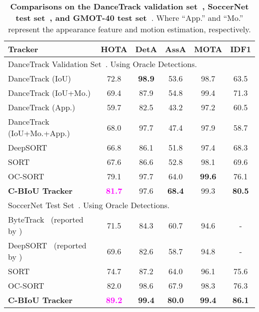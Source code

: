\documentclass[journal]{IEEEtran}
\begin{document}
\begin{table}[t]
\caption{\textbf{Comparisons on the DanceTrack validation set~\cite{sun2022dancetrack}, SoccerNet test set~\cite{cioppa2022soccernet,deliege2021soccernet}, and GMOT-40 test set~\cite{bai2021gmot}}. Where ``App.''  and ``Mo.'' represent the appearance feature and motion estimation, respectively. }
   
\centering
   \setlength{\tabcolsep}{0.5pt}
   \footnotesize
   \begin{tabular}{ l ccccc}
   \toprule
   Tracker & HOTA & DetA & AssA & MOTA & IDF1\\
   \midrule
   \hline
   \multicolumn{6}{l}{DanceTrack Validation Set~\cite{sun2022dancetrack}. Using Oracle Detections. }   \\
DanceTrack (IoU) \cite{sun2022dancetrack} & 72.8 & \textbf{98.9} & 53.6 & 98.7 & 63.5\\  
   DanceTrack (IoU+Mo.) \cite{sun2022dancetrack}  & 69.4 & 87.9 & 54.8 & 99.4 & 71.3\\ 
   DanceTrack (App.) \cite{sun2022dancetrack} &  59.7 & 82.5 & 43.2 & 97.2 & 60.5\\ 
   DanceTrack (IoU+Mo.+App.) \cite{sun2022dancetrack} &   68.0 & 97.7 & 47.4 & 97.9 & 58.7\\ 
   DeepSORT~\cite{DeepSORT}  & 66.8 & 86.1 &  51.8 & 97.4  & 68.3\\
   SORT~\cite{SORT}  &67.6 & 86.6 & 52.8 & 98.1 & 69.6\\
   OC-SORT~\cite{cao2022observation}  & 79.1& 97.7 &  64.0 & \textbf{99.6}  & 76.1\\
   \textbf{C-BIoU Tracker}  &  \textcolor{magenta}{\textbf{81.7}} & 97.6 & \textbf{68.4} & 99.3 & \textbf{80.5}\\
\hline
   \multicolumn{6}{l}{SoccerNet Test Set~\cite{cioppa2022soccernet,deliege2021soccernet}. Using Oracle Detections. }   \\
ByteTrack~\cite{bytetrack} (reported by \cite{cioppa2022soccernet}) & 71.5 &84.3 &60.7 & 94.6 & -\\
   DeepSORT~\cite{DeepSORT} (reported by \cite{cioppa2022soccernet}) & 69.6 &82.6 &58.7 &94.8 & -\\
SORT~\cite{SORT}  &74.7 & 87.2 & 64.0 & 96.1 & 75.6\\
   OC-SORT~\cite{cao2022observation}  & 82.0& 98.6 &  67.9 & 98.3  & 76.3\\
   \textbf{C-BIoU Tracker}  & \textcolor{magenta}{\textbf{89.2}} & \textbf{99.4} & \textbf{80.0} & \textbf{99.4} & \textbf{86.1}\\

\end{tabular}
\end{table}
\end{document}
